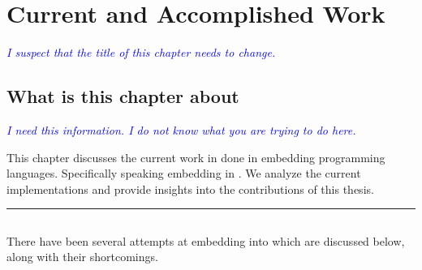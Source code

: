 \documentclass[thesis-solanki.tex]{subfiles}
\begin{document}
\chapter{Current and Accomplished Work}\label{chap:proposedWork}

\textcolor{blue}{\textsl{I suspect that the title of this chapter needs to change.}}

\section{What is this chapter about}\label{sec:what-this-chapter:proposedWork}

\textcolor{blue}{\textsl{I need this information.
    I do not know what you are trying to do here.
}}

This chapter discusses the current work in done in embedding programming languages. Specifically speaking embedding  in 
. We analyze the current implementations and provide insights into the contributions of this thesis. 

\noindent\rule{\textwidth}{0.5pt}


\section{}

There have been several attempts at embedding  into  which are
discussed below{\large,} along with their shortcomings.
\end{document}
